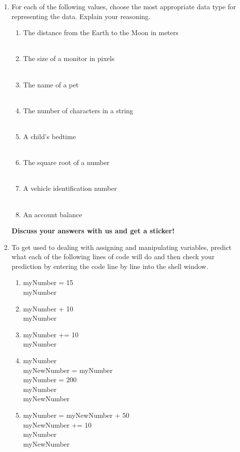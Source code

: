 \documentclass[11pt, letterpaper, onecolumn, oneside, final]{article}
\begin{document}
\begin{enumerate}
\item For each of the following values, choose the most appropriate data type for representing the data. Explain your reasoning.

\begin{enumerate} 
    \item  The distance from the Earth to the Moon in meters\\
    \\
    \item  The size of a monitor in pixels\\
    \\
    \item  The name of a pet\\
    \\
    \item The number of characters in a string\\
    \\
    \item A child’s bedtime\\
    \\
    \item The square root of a number\\
    \\
    \item A vehicle identification number\\
    \\
    \item An account balance\\
\end{enumerate}
\textbf{Discuss your answers with us and get a sticker!}
\item To get used to dealing with assigning and manipulating variables, predict what each of the following lines of code will do and then check your prediction by entering the code line by line into the shell window.

\begin{enumerate}
    \item {\consolas myNumber = 15 \\ myNumber\\}
    \item {\consolas myNumber + 10 \\
    myNumber\\}
    \item {\consolas myNumber += 10 \\ myNumber\\}
    \item {\consolas myNumber \\ myNewNumber = myNumber \\myNumber = 200\\ myNumber\\myNewNumber\\}
    \item {\consolas myNumber = myNewNumber + 50 \\ myNewNumber += 10 \\myNumber\\myNewNumber\\}
\end{enumerate}



\end{enumerate}
\end{document}
